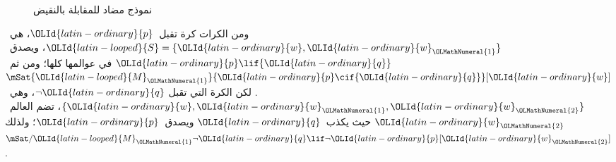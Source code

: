 \documentclass[../../../include/open-logic-section]{subfiles}
\begin{document}
\begin{ex}
\begin{figure}
\begin{center}
\caption{نموذج مضاد للمقابلة بالنقيض}
\end{center}
\end{figure}
ومن الكرات كرة تقبل~${\OLId{latin-ordinary}{p}}$، هي~${\OLId{latin-looped}{S}} = \{{\OLId{latin-ordinary}{w}}, {\OLId{latin-ordinary}{w}}_{\OLMathNumeral{1}}\}$، ويصدق~${\OLId{latin-ordinary}{p}} \lif {\OLId{latin-ordinary}{q}}$ في
عوالمها كلها؛ ومن ثم~$\mSat{{\OLId{latin-looped}{M}}_{\OLMathNumeral{1}}}{{\OLId{latin-ordinary}{p}} \cif {\OLId{latin-ordinary}{q}}}[{\OLId{latin-ordinary}{w}}]$. لكن الكرة التي تقبل
$\lnot {\OLId{latin-ordinary}{q}}$، وهي~$\{{\OLId{latin-ordinary}{w}}, {\OLId{latin-ordinary}{w}}_{\OLMathNumeral{1}}, {\OLId{latin-ordinary}{w}}_{\OLMathNumeral{2}}\}$، تضم العالم~${\OLId{latin-ordinary}{w}}_{\OLMathNumeral{2}}$ حيث يكذب~${\OLId{latin-ordinary}{q}}$
ويصدق~${\OLId{latin-ordinary}{p}}$؛ ولذلك
$\mSat/{{\OLId{latin-looped}{M}}_{\OLMathNumeral{1}}}{\lnot {\OLId{latin-ordinary}{q}} \lif \lnot {\OLId{latin-ordinary}{p}}}[{\OLId{latin-ordinary}{w}}_{\OLMathNumeral{2}}]$.
\end{ex}
\end{document}
